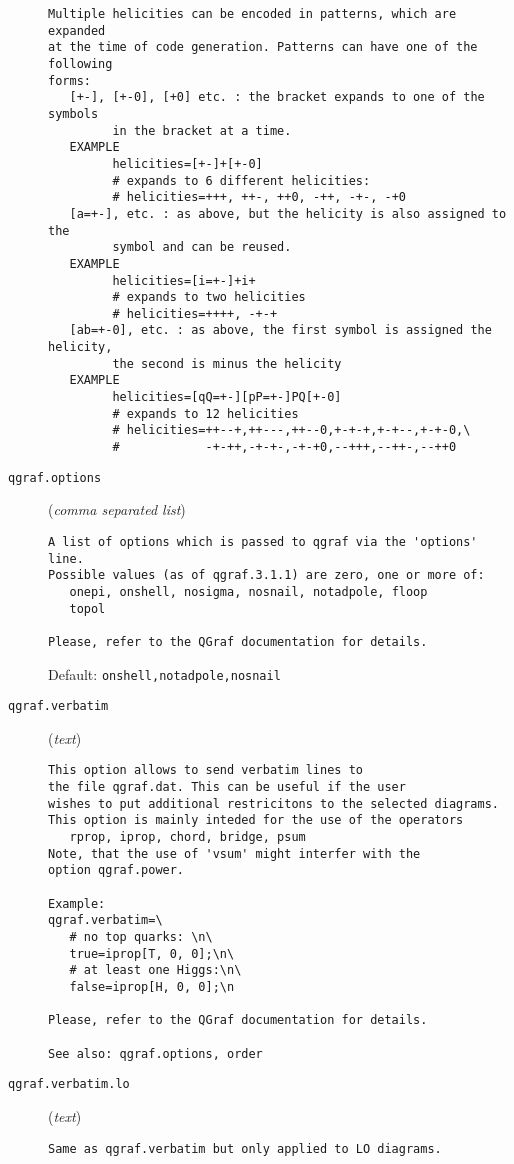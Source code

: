 \begin{description}
\begin{verbatim}
Multiple helicities can be encoded in patterns, which are expanded
at the time of code generation. Patterns can have one of the following
forms:
   [+-], [+-0], [+0] etc. : the bracket expands to one of the symbols
         in the bracket at a time.
   EXAMPLE
         helicities=[+-]+[+-0]
         # expands to 6 different helicities:
         # helicities=+++, ++-, ++0, -++, -+-, -+0
   [a=+-], etc. : as above, but the helicity is also assigned to the
         symbol and can be reused.
   EXAMPLE
         helicities=[i=+-]+i+
         # expands to two helicities
         # helicities=++++, -+-+
   [ab=+-0], etc. : as above, the first symbol is assigned the helicity,
         the second is minus the helicity
   EXAMPLE
         helicities=[qQ=+-][pP=+-]PQ[+-0]
         # expands to 12 helicities
         # helicities=++--+,++---,++--0,+-+-+,+-+--,+-+-0,\
         #            -+-++,-+-+-,-+-+0,--+++,--++-,--++0
\end{verbatim}
\item[\texttt{qgraf.options}] (\textit{comma separated list})
\begin{verbatim}
A list of options which is passed to qgraf via the 'options' line.
Possible values (as of qgraf.3.1.1) are zero, one or more of:
   onepi, onshell, nosigma, nosnail, notadpole, floop
   topol

Please, refer to the QGraf documentation for details.
\end{verbatim}
Default: \verb|onshell,notadpole,nosnail|
\item[\texttt{qgraf.verbatim}] (\textit{text})
\begin{verbatim}
This option allows to send verbatim lines to
the file qgraf.dat. This can be useful if the user
wishes to put additional restricitons to the selected diagrams.
This option is mainly inteded for the use of the operators
   rprop, iprop, chord, bridge, psum
Note, that the use of 'vsum' might interfer with the
option qgraf.power.

Example:
qgraf.verbatim=\
   # no top quarks: \n\
   true=iprop[T, 0, 0];\n\
   # at least one Higgs:\n\
   false=iprop[H, 0, 0];\n

Please, refer to the QGraf documentation for details.

See also: qgraf.options, order
\end{verbatim}
\item[\texttt{qgraf.verbatim.lo}] (\textit{text})
\begin{verbatim}
Same as qgraf.verbatim but only applied to LO diagrams.


\end{verbatim}
\end{description}

